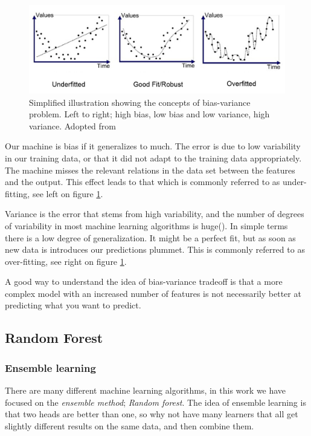 \begin{figure}[H]
     \centering
     \includegraphics[width=\linewidth]{theory/figures/Bias_variance.png}
     \caption{Simplified illustration showing the concepts of bias-variance problem. Left to right; high bias, low bias and low variance, high variance. Adopted from \cite{fig:bias_var}}
     \label{fig:bias_var}
\end{figure}
Our machine is bias if it generalizes to much. The error is due to low variability in our training data, or that it did not adapt to the training data appropriately. The machine misses the relevant relations in the data set between the features and the output. This effect leads to that which is commonly referred to as under-fitting, see left on figure \ref{fig:bias_var}. 

Variance is the error that stems from high variability, and the number of degrees of variability in most machine learning algorithms is huge(\cite{marsland2014machine}). In simple terms there is a low degree of generalization. It might be a perfect fit, but as soon as new data is introduces our predictions plummet. This is commonly referred to as over-fitting, see right on figure \ref{fig:bias_var}. 

A good way to understand the idea of bias-variance tradeoff is that a more complex model with an increased number of features is not necessarily better at predicting what you want to predict. 


\subsection{Random Forest}


\subsubsection{Ensemble learning}
	There are many different machine learning algorithms, in this work we have focused on the \textit{ensemble method}; \textit{Random forest}\cite{breiman2001random}. The idea of ensemble learning is that two heads are better than one, so why not have many learners that all get slightly different results on the same data, and then combine them.  
	

